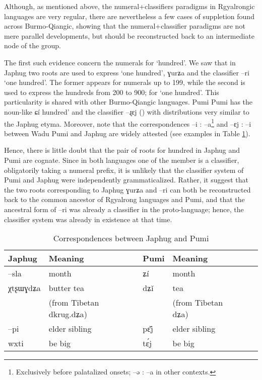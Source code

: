 \documentclass[oldfontcommands,oneside,a4paper,12pt]{article}
\newcommand{\ipa}[1]{{\phon#1}}
\begin{document}
Although, as mentioned above, the numeral+classifiers paradigms in Rgyalrongic languages are very regular, there are nevertheless a few cases of suppletion found across Burmo-Qiangic, showing that the numeral+classifier paradigms are not mere parallel developments, but should be reconstructed back to  an intermediate node of the group.

The first such evidence concern the numerals for `hundred'. We saw that in Japhug two roots are used to express `one hundred',  \ipa{ɣurʑa}  and the classifier \ipa{--ri} `one hundred'. The former appears for numerals up to 199, while the second is used to express the hundreds from 200 to 900; for `one hundred'. This particularity is shared with  other Burmo-Qiangic languages. Pumi  Pumi   has the noun-like \ipa{ɕí}  hundred' and the classifier \ipa{--ɻɛj} (\citealt[101]{daudey14grammar}) with distributions very similar to the Japhug etyma. Moreover,  note that the correspondences \ipa{--i} : \ipa{--a}\footnote{Exclusively before palatalized onsets; \ipa{--ə} : \ipa{--a} in other contexts.} and \ipa{--ɛj} : \ipa{--i} between Wadu Pumi and Japhug are widely attested (see examples in Table \ref{tab:jpg.pumi}).


Hence, there is little doubt that the pair of roots for hundred in Japhug and Pumi are cognate. Since in both languages one of the member is a classifier, obligatorily taking a numeral prefix, it is unlikely that the classifier system of Pumi and Japhug were independently grammaticalized. Rather, it suggest that the two roots corresponding to Japhug \ipa{ɣurʑa} and \ipa{--ri} can both be reconstructed back to the common ancestor of Rgyalrong languages and Pumi, and that the ancestral form of \ipa{--ri} was already a classifier in the proto-language; hence, the classifier system was already in existence at that time.

\begin{table}[H]
\caption{Correspondences between Japhug and Pumi} \label{tab:jpg.pumi} \centering
\begin{tabular}{llllll}
\toprule
Japhug & Meaning & Pumi & Meaning \\
\midrule
 \ipa{--sla} &month &\ipa{ʑí} & month\\
\ipa{χtʂɯɣdʑa} &butter tea  & \ipa{dʑǐ} & tea  \\
&(from Tibetan \ipa{dkrug.dʑa})&&(from Tibetan \ipa{dʑa})&\\
\midrule
 \ipa{--pi} &elder sibling &\ipa{pɛ̌j} & elder sibling\\
  \ipa{wxti} &be big & \ipa{tɛ́j}  & be big\\
\bottomrule
\end{tabular}
\end{table}
 
\end{document}
